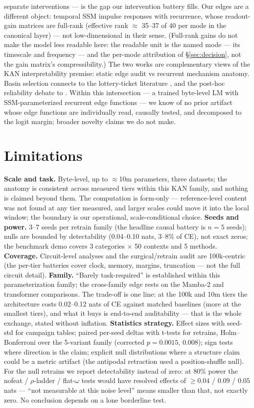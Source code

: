 \documentclass[11pt]{article}
\begin{document}
separate interventions --- is the gap our intervention battery fills. Our edges are a different object: temporal SSM impulse responses
with recurrence, whose readout-gain matrices are full-rank (effective rank
$\approx$ 35--37 of 40 per mode in the canonical layer) --- not
low-dimensional in their sense. (Full-rank gains do not make the model
less readable here: the readable unit is the named mode --- its timescale
and frequency --- and the per-mode attribution of \S\ref{sec:decision},
not the gain matrix's compressibility.) The two works are complementary views of
the KAN interpretability premise: static edge audit vs recurrent mechanism
anatomy. Basin selection connects to the lottery-ticket literature
\cite{lth}, and the post-hoc reliability debate to
\cite{wiegreffe-pinter,geirhos}. Within this intersection --- a trained
byte-level LM with SSM-parameterized recurrent edge functions --- we know
of no prior artifact whose edge functions are individually read, causally
tested, and decomposed to the logit margin; broader novelty claims we do
not make.

\section{Limitations}

\textbf{Scale and task.} Byte-level, up to $\approx$10m parameters, three datasets;
the anatomy is consistent across measured tiers within this KAN family,
and nothing is claimed beyond them. The computation is form-only ---
reference-level content was not found at any tier measured, and larger
scales could move it into the local window; the boundary is our
operational, scale-conditional choice.
\textbf{Seeds and power.} 3--7 seeds per retrain family (the headline
causal battery is $n{=}5$ seeds); nulls are bounded by detectability
(0.04--0.10 nats, 3--8\% of CE), not exact zeros; the benchmark demo
covers 3 categories $\times$ 50 contexts and 5 methods.
\textbf{Coverage.} Circuit-level analyses and the surgical/retrain audit
are 100k-centric (the per-tier batteries cover clock, memory, margins,
truncation --- not the full circuit detail).
\textbf{Family.} ``Barely task-required'' is established within this
parameterization family; the cross-family edge rests on the Mamba-2 and
transformer comparisons. The trade-off is one line: at the 100k and 10m
tiers the architecture costs 0.02--0.12 nats of CE against matched
baselines (more at the smallest tiers), and what it buys is
end-to-end auditability --- that is the whole exchange, stated without
inflation.
\textbf{Statistics strategy.} Effect sizes with seed-std for campaign
tables; paired per-seed deltas with t-tests for retrains, Holm--Bonferroni
over the 5-variant family (corrected $p = 0.0015$, $0.008$); sign tests
where direction is the claim; explicit null distributions where a
structure claim could be a metric artifact (the antipodal retraction used
a position-shuffle null). For the null retrains we report detectability
instead of zero: at 80\% power the nofeat / $\rho$-ladder / flat-$\omega$
tests would have resolved effects of $\ge 0.04$ / $0.09$ / $0.05$
nats --- ``not measurable at this noise level'' means smaller than that,
not exactly zero. No conclusion depends on a lone borderline test.
\end{document}
